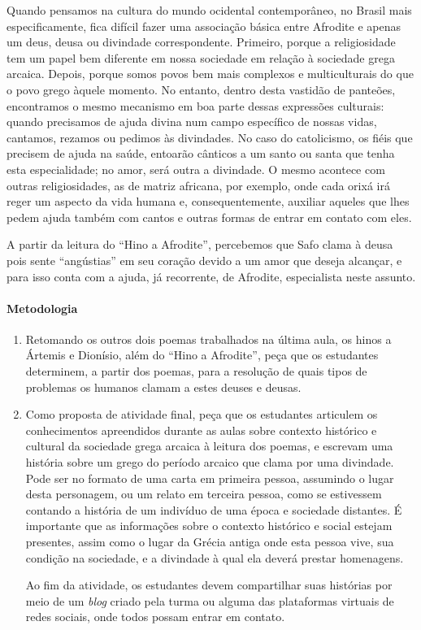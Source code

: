 \documentclass[12pt]{extarticle}
\begin{document}
Quando pensamos na cultura do mundo ocidental contemporâneo, no Brasil mais
especificamente, fica difícil fazer uma associação básica entre Afrodite e apenas
um deus, deusa ou divindade correspondente. Primeiro, porque a religiosidade
tem um papel bem diferente em nossa sociedade em relação à sociedade grega
arcaica. Depois, porque somos povos bem mais complexos e multiculturais do que 
o povo grego àquele momento. No entanto, dentro desta vastidão de panteões,
encontramos o mesmo mecanismo em boa parte dessas expressões culturais: 
quando precisamos de ajuda divina num campo específico de nossas vidas, 
cantamos, rezamos ou pedimos às divindades. No caso do catolicismo, os fiéis
que precisem de ajuda na saúde, entoarão cânticos a um santo ou santa que
tenha esta especialidade; no amor, será outra a divindade. O mesmo acontece
com outras religiosidades, as de matriz africana, por exemplo, onde cada
orixá irá reger um aspecto da vida humana e, consequentemente, auxiliar 
aqueles que lhes pedem ajuda também com cantos e outras formas de entrar
em contato com eles.

A partir da leitura do ``Hino a Afrodite'', percebemos que Safo clama
à deusa pois sente ``angústias'' em seu coração devido a um amor
que deseja alcançar, e para isso conta com a ajuda, já recorrente,
de Afrodite, especialista neste assunto. 


\paragraph{Metodologia}

\begin{enumerate}
\item
Retomando os outros dois poemas trabalhados na última aula, os hinos a 
Ártemis e Dionísio, além do ``Hino a Afrodite'', peça que os estudantes 
determinem, a partir dos poemas, para a resolução de quais tipos de 
problemas os humanos clamam a estes deuses e deusas. 

\item
Como proposta de atividade final, peça que os estudantes articulem
os conhecimentos apreendidos durante as aulas sobre contexto histórico e cultural
da sociedade grega arcaica à leitura dos poemas, e escrevam 
uma história sobre um grego do período arcaico que clama por uma
divindade. Pode ser no formato de uma carta em primeira pessoa, assumindo o lugar
desta personagem, ou um relato em terceira pessoa, como se estivessem contando a história
de um indivíduo de uma época e sociedade distantes. É importante que as informações 
sobre o contexto histórico e social estejam presentes, assim como o lugar da Grécia antiga 
onde esta pessoa vive, sua condição na sociedade, e a divindade à qual ela deverá
prestar homenagens. 

Ao fim da atividade, os estudantes devem compartilhar suas histórias por meio de um
\textit{blog} criado pela turma ou alguma das plataformas virtuais de redes sociais,
onde todos possam entrar em contato.
\end{enumerate}
\end{document}
